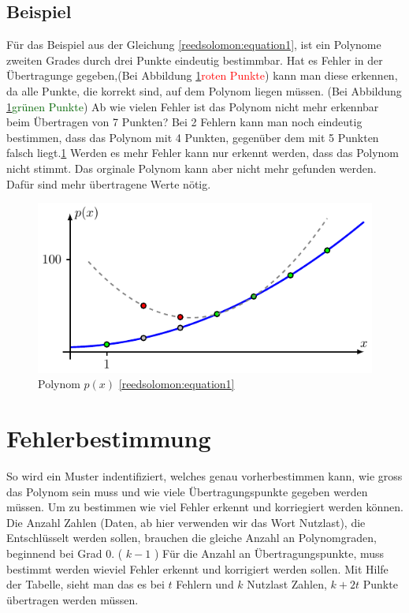 \subsection{Beispiel}
Für das Beispiel aus der Gleichung \eqref{reedsolomon:equation1},
ist ein Polynome zweiten Grades durch drei Punkte eindeutig bestimmbar.
Hat es Fehler in der Übertragunge gegeben,(Bei Abbildung \ref{fig:polynom}\textcolor{red}{roten Punkte}) kann man diese erkennen,
da alle Punkte, die korrekt sind, auf dem Polynom liegen müssen. 
(Bei Abbildung \ref{fig:polynom}\textcolor{darkgreen}{grünen Punkte})
Ab wie vielen Fehler ist das Polynom nicht mehr erkennbar beim Übertragen von 7 Punkten?
Bei 2 Fehlern kann man noch eindeutig bestimmen, dass das Polynom mit 4 Punkten,
gegenüber dem mit 5 Punkten falsch liegt.\ref{fig:polynom}
Werden es mehr Fehler kann nur erkennt werden, dass das Polynom nicht stimmt.
Das orginale Polynom kann aber nicht mehr gefunden werden.
Dafür sind mehr übertragene Werte nötig.

\begin{figure}
	\centering
	\includegraphics[width=\textwidth]{papers/reedsolomon/figures/polynom2}
	\caption{Polynom $p(x)$ \eqref{reedsolomon:equation1}}
	\label{fig:polynom}
\end{figure}

\section{Fehlerbestimmung
\label{reedsolomon:section:Fehlerbestimmmung}}
So wird ein Muster indentifiziert, welches genau vorherbestimmen kann,
wie gross das Polynom sein muss und wie viele Übertragungspunkte gegeben werden müssen.
Um zu bestimmen wie viel Fehler erkennt und korriegiert werden können.
Die Anzahl Zahlen (Daten, ab hier verwenden wir das Wort Nutzlast),
die Entschlüsselt werden sollen, brauchen die gleiche Anzahl an  Polynomgraden, beginnend bei Grad 0. ( \( k-1 \) )
Für die Anzahl an Übertragungspunkte, muss bestimmt werden wieviel Fehler erkennt und korrigiert werden sollen.
Mit Hilfe der Tabelle, sieht man das es bei $t$ Fehlern und $k$ Nutzlast Zahlen,
$k+2t$ Punkte übertragen werden müssen.

